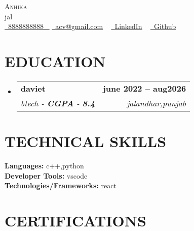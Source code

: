 \documentclass[letterpaper,11pt]{article}
\makeatletter
\newcommand{\resumeSubheading}[4]{
  \vspace{-2pt}\item
    \begin{tabular*}{1.0\textwidth}[t]{l@{\extracolsep{\fill}}r}
      \textbf{\large#1} & \textbf{\small #2} \\
      \textit{\large#3} & \textit{\small #4} \\
     
    \end{tabular*}\vspace{-7pt}
}
\newcommand{\resumeSubHeadingListStart}{\begin{itemize}[leftmargin=0.0in, label={}]}
\newcommand{\resumeSubHeadingListEnd}{\end{itemize}}
\makeatother
\begin{document}

\begin{center}
    {\Huge \scshape Anhika} \\ \vspace{1pt}
    jal \\ \vspace{1pt}
    \small 
    \small \href{8888888888}{ \raisebox{-0.1\height}\faPhone\ \underline{8888888888} ~} 
    \href{acv@gmail.com}{\raisebox{-0.2\height}\faEnvelope\  \underline{acv@gmail.com}} ~
    \href{wefrfgrg}{\raisebox{-0.2\height}\faLinkedinSquare\ \underline{LinkedIn}}  ~
    \href{dcsfvabverb}{\raisebox{-0.2\height}\faGithub\ \underline{Github}} ~
\end{center}

\section{EDUCATION}
  \resumeSubHeadingListStart
    \resumeSubheading
      {daviet}{june 2022 -- aug2026}
      {btech - \textbf{CGPA} - \textbf{8.4} }{jalandhar,punjab}
  \resumeSubHeadingListEnd
\section{TECHNICAL SKILLS}
 \begin{itemize}[leftmargin=0.15in, label={}]
    \small{\item{
     \textbf{\normalsize{Languages:}}{ \normalsize{c++,python}} \\
     \textbf{\normalsize{Developer Tools:}}{ \normalsize{vscode}} \\
     \textbf{\normalsize{Technologies/Frameworks:}}{\normalsize{ react}} \\
    }}
 \end{itemize}
 \vspace{-15pt}



\section{CERTIFICATIONS}
\end{document}
